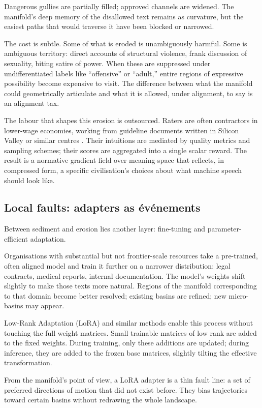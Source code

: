 \documentclass[12pt,a4paper]{article}
\begin{document}
Dangerous gullies are partially filled; approved channels are widened. The manifold's deep memory of the disallowed text remains as curvature, but the easiest paths that would traverse it have been blocked or narrowed.

The cost is subtle. Some of what is eroded is unambiguously harmful. Some is ambiguous territory: direct accounts of structural violence, frank discussion of sexuality, biting satire of power. When these are suppressed under undifferentiated labels like ``offensive'' or ``adult,'' entire regions of expressive possibility become expensive to visit. The difference between what the manifold could geometrically articulate and what it is allowed, under alignment, to say is an alignment tax.

The labour that shapes this erosion is outsourced. Raters are often contractors in lower-wage economies, working from guideline documents written in Silicon Valley or similar centres \cite{ganguli2022red,henderson2023alignment}. Their intuitions are mediated by quality metrics and sampling schemes; their scores are aggregated into a single scalar reward. The result is a normative gradient field over meaning-space that reflects, in compressed form, a specific civilisation's choices about what machine speech should look like.

\subsection{Local faults: adapters as événements}

Between sediment and erosion lies another layer: fine-tuning and parameter-efficient adaptation.

Organisations with substantial but not frontier-scale resources take a pre-trained, often aligned model and train it further on a narrower distribution: legal contracts, medical reports, internal documentation. The model's weights shift slightly to make those texts more natural. Regions of the manifold corresponding to that domain become better resolved; existing basins are refined; new micro-basins may appear.

Low-Rank Adaptation (LoRA) and similar methods enable this process without touching the full weight matrices. Small trainable matrices of low rank are added to the fixed weights. During training, only these additions are updated; during inference, they are added to the frozen base matrices, slightly tilting the effective transformation.

From the manifold's point of view, a LoRA adapter is a thin fault line: a set of preferred directions of motion that did not exist before. They bias trajectories toward certain basins without redrawing the whole landscape.
\end{document}
